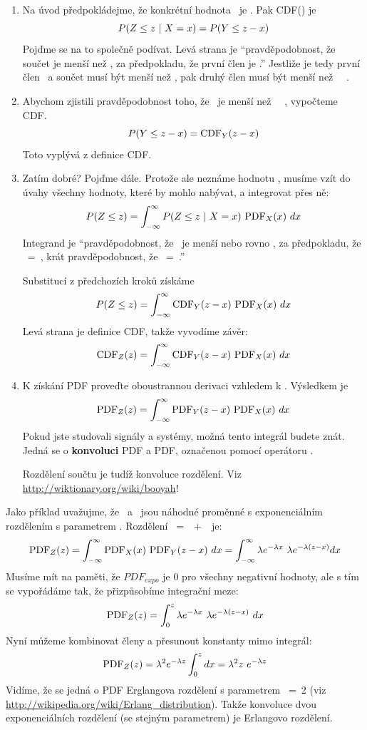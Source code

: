 \documentclass[12pt]{book}
\begin{document}
\begin{enumerate}

\item Na úvod předpokládejme, že konkrétní hodnota \X~je \x.  Pak CDF(\z) je
%
\[ P(Z \le z ~|~ X = x)  =  P(Y \le z-x) \]
%
Pojďme se na to společně podívat. Levá strana je ``pravděpodobnost, že součet je menší než \z, za předpokladu, že první člen je \x.''  Jestliže je tedy první člen \x~a součet musí být menší než \z, pak druhý člen musí být menší než \z~\minus~\x.

\item Abychom zjistili pravděpodobnost toho, že \Y~je menší než \z~\minus~\x, vypočteme CDF.
%
\[ P(Y \le z-x) = \mathrm{CDF}_Y(z-x) \]
%
Toto vyplývá z definice CDF.

\item Zatím dobré?  Pojďme dále.  Protože ale neznáme hodnotu \x, musíme vzít do úvahy všechny hodnoty, které by mohlo nabývat, a integrovat přes ně:
%
\[ P(Z \le z) = \int_{-\infty}^{\infty} P(Z \le z ~|~ X = x) ~ \mathrm{PDF}_X(x) ~ dx \]
%
Integrand je ``pravděpodobnost, že \Z~je menší nebo rovno
\z, za předpokladu, že \X~=~\x, krát pravděpodobnost, že \X~=~\x.''

Substitucí z předchozích kroků získáme
%
\[ P(Z \le z) = \int_{-\infty}^{\infty} \mathrm{CDF}_Y(z-x) ~ \mathrm{PDF}_X(x) ~ dx \]
%
Levá strana je definice CDF, takže vyvodíme závěr:
%
\[ \mathrm{CDF}_Z(z) = \int_{-\infty}^{\infty} \mathrm{CDF}_Y(z-x) ~ \mathrm{PDF}_X(x) ~ dx \]
%

\item K získání PDF proveďte oboustrannou derivaci vzhledem k \z. Výsledkem je
%
\[ \mathrm{PDF}_Z(z) = \int_{-\infty}^{\infty} \mathrm{PDF}_Y(z-x) ~ \mathrm{PDF}_X(x) ~ dx  \]
%
Pokud jste studovali signály a systémy, možná tento integrál budete znát. Jedná se o {\bf konvoluci} PDF a PDF,
označenou pomocí operátoru \mystar.


Rozdělení součtu je tudíž konvoluce rozdělení. Viz \url{http://wiktionary.org/wiki/booyah}!

\end{enumerate}

Jako příklad uvažujme, že \X~a \Y~jsou náhodné proměnné s exponenciálním rozdělením s parametrem \mylambda.
Rozdělení \Z~=~\X~+~\Y~je:
%
\[ \mathrm{PDF}_Z(z) = \int_{-\infty}^{\infty} \mathrm{PDF}_X(x)~\mathrm{PDF}_Y(z-x) ~ dx =
\int_{-\infty}^{\infty} \lambda e^{-\lambda x}~\lambda e^{-\lambda (z-x)} dx \]
%
Musíme mít na paměti, že $PDF_{expo}$ je 0 pro všechny negativní hodnoty, ale s tím se vypořádáme tak, že přizpůsobíme integrační meze:
%
\[ \mathrm{PDF}_Z(z) = \int_{0}^{z} \lambda e^{-\lambda x}~\lambda e^{-\lambda (z-x)} ~ dx \]
%
Nyní můžeme kombinovat členy a přesunout konstanty mimo integrál:
%
\[ \mathrm{PDF}_Z(z) = \lambda^2 e^{-\lambda z} \int_{0}^{z} dx =
\lambda^2 z ~ e^{-\lambda z} \]
%
Vidíme, že se jedná o PDF Erglangova rozdělení s parametrem \kk~=~2 (viz \url{http://wikipedia.org/wiki/Erlang_distribution}).
Takže konvoluce dvou exponenciálních rozdělení (se stejným parametrem) je Erlangovo rozdělení.
\end{document}
